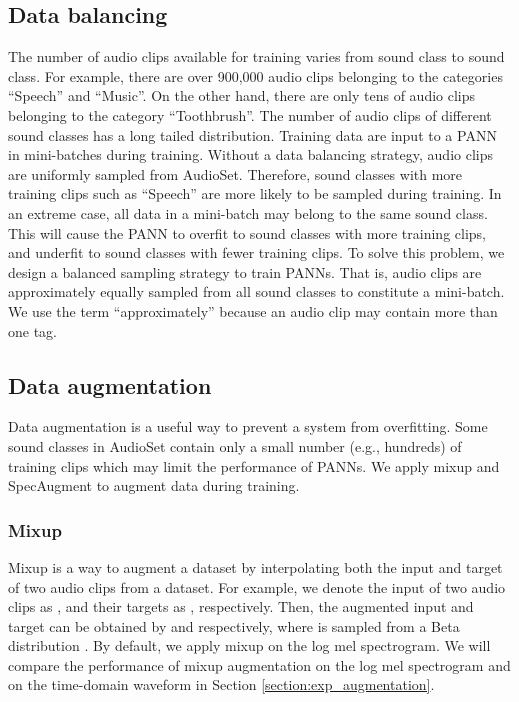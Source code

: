 \documentclass[journal]{IEEEtran}
\newcommand{\qk}[1] {{\color{black} #1}}
\begin{document}
\subsection{Data balancing}\label{section:data_balancing}
The number of audio clips available for training varies from sound class to sound class. For example, there are over 900,000 audio clips belonging to the categories ``Speech'' and ``Music''. On the other hand, there are only tens of audio clips belonging to the category ``Toothbrush''. The number of audio clips of different sound classes has a long tailed distribution. Training data are input to a PANN in mini-batches during training. Without a data balancing strategy, audio clips are uniformly sampled from AudioSet. Therefore, sound classes with more training clips such as ``Speech'' are more likely to be sampled during training. In an extreme case, all data in a mini-batch may belong to the same sound class. This will cause the PANN to overfit to sound classes with more training clips, and underfit to sound classes with fewer training clips. \qk{To solve this problem, we design a balanced sampling strategy to train PANNs. That is, audio clips are approximately equally sampled from all sound classes to constitute a mini-batch.} We use the term ``approximately'' because an audio clip may contain more than one tag.

\subsection{Data augmentation}
Data augmentation is a useful way to prevent a system from overfitting. Some sound classes in AudioSet contain only a small number (e.g., hundreds) of training clips which may limit the performance of PANNs. We apply mixup \cite{zhang2017mixup} and SpecAugment \cite{park2019specaugment} to augment data during training. 

\subsubsection{Mixup}
Mixup \cite{zhang2017mixup} is a way to augment a dataset by interpolating both the input and target of two audio clips from a dataset. For example, we denote the input of two audio clips as , and their targets as , respectively. Then, the augmented input and target can be obtained by  and  respectively, where  is sampled from a Beta distribution \cite{zhang2017mixup}. \qk{By default, we apply mixup on the log mel spectrogram. We will compare the performance of mixup augmentation on the log mel spectrogram and on the time-domain waveform in Section \ref{section:exp_augmentation}}.
\end{document}
